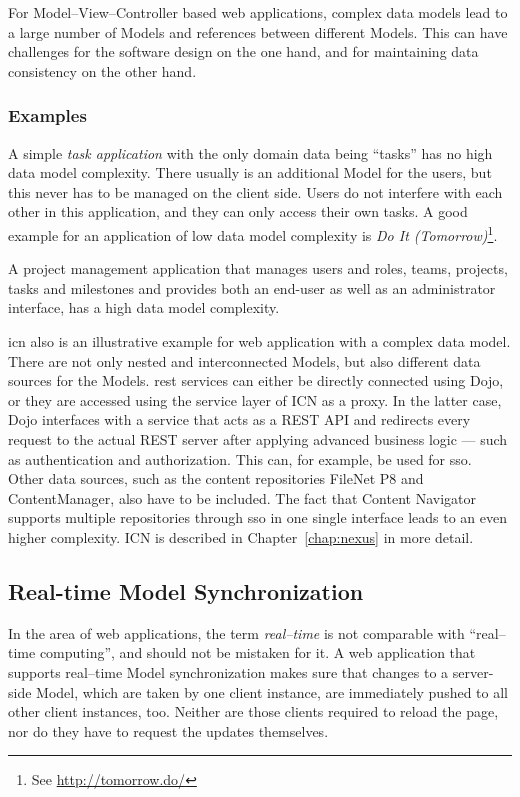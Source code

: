 For Model--View--Controller based web applications, complex data models lead to a large number of Models and references between different Models. This can have challenges for the software design on the one hand, and for maintaining data consistency on the other hand.

\subsubsection{Examples}
A simple \emph{task application} with the only domain data being ``tasks'' has no high data model complexity. There usually is an additional Model for the users, but this never has to be managed on the client side. Users do not interfere with each other in this application, and they can only access their own tasks. A good example for an application of low data model complexity is \emph{Do It (Tomorrow)}\footnote{See \url{http://tomorrow.do/}}.

A project management application that manages users and roles, teams, projects, tasks and milestones and provides both an end-user as well as an administrator interface, has a high data model complexity.

\acl{icn} also is an illustrative example for web application with a complex data model. There are not only nested and interconnected Models, but also different data sources for the Models. \ac{rest} services can either be directly connected using Dojo, or they are accessed using the service layer of ICN as a proxy. In the latter case, Dojo interfaces with a service that acts as a REST API and redirects every request to the actual REST server after applying advanced business logic --- such as authentication and authorization. This can, for example, be used for \ac{sso}. Other data sources, such as the content repositories FileNet P8 and ContentManager, also have to be included. The fact that Content Navigator supports multiple repositories through \ac{sso} in one single interface leads to an even higher complexity. ICN is described in Chapter~\ref{chap:nexus} in more detail.


\subsection{Real-time Model Synchronization} %
\label{sec:realtime}
In the area of web applications, the term \emph{real--time} is not comparable with ``real--time computing'', and should not be mistaken for it. A web application that supports real--time Model synchronization makes sure that changes to a server-side Model, which are taken by one client instance, are immediately pushed to all other client instances, too. Neither are those clients required to reload the page, nor do they have to request the updates themselves.

